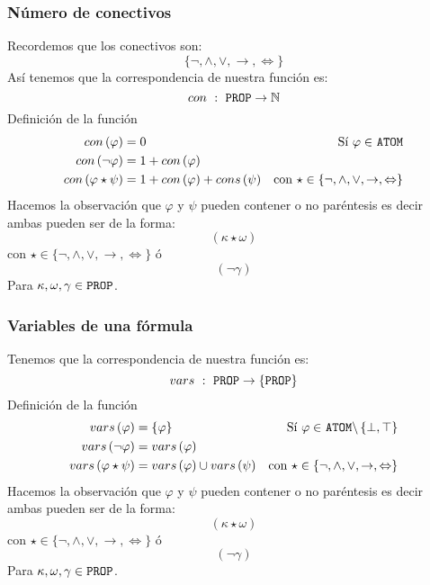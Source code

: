 \documentclass[a4paper]{article}
\begin{document}
\subsubsection{Número de conectivos}
\noindent
Recordemos que los conectivos son:
\[
    \{\neg, \land, \lor, \rightarrow, \Leftrightarrow\}  
\]
Así tenemos que la correspondencia de nuestra función es:
\[
      con \ : \ \text{\texttt{PROP}} \to \mathbb{N}
\]
Definición de la función
\begin{align*}
    con\left(\varphi\right) &= 0 &\text{Sí \(\varphi \in\) \texttt{ATOM}} \\
    con\left(\neg \varphi\right) &= 1 + con\left(\varphi\right) & \\
    con\left(\varphi \star \psi \right) &= 1 + con\left(\varphi\right) + cons\left(\psi\right) & \text{con \(\star \in \{ \neg, \land, \lor, \rightarrow, \Leftrightarrow \}\)} \\
\end{align*}
Hacemos la observación que \(\varphi\) y \(\psi\) pueden contener o no paréntesis es decir ambas pueden ser de la forma:
\[
    \left(\kappa \star \omega \right)  
\]
con \(\star \in \{ \neg, \land, \lor, \rightarrow, \Leftrightarrow \}\) ó
\[
    \left(\neg \gamma\right)
\]
Para \(\kappa, \omega, \gamma \in \text{\texttt{PROP}}\).
\subsubsection{Variables de una fórmula}
Tenemos que la correspondencia de nuestra función es:
\[
      vars \ : \ \text{\texttt{PROP}} \to \{\text{\texttt{PROP}}\}
\]
Definición de la función
\begin{align*}
    vars\left(\varphi\right) &= \{ \varphi \} &\text{Sí \(\varphi \in\) \texttt{ATOM\(\setminus \left\{\bot, \top\right\}\)}} \\
    vars\left(\neg \varphi\right) &= vars\left(\varphi\right) & \\
    vars\left(\varphi \star \psi \right) &= vars\left(\varphi\right) \cup vars\left(\psi\right) & \text{con \(\star \in \{ \neg, \land, \lor, \rightarrow, \Leftrightarrow \}\)} \\
\end{align*}
Hacemos la observación que \(\varphi\) y \(\psi\) pueden contener o no paréntesis es decir ambas pueden ser de la forma:
\[
    \left(\kappa \star \omega \right)  
\]
con \(\star \in \{ \neg, \land, \lor, \rightarrow, \Leftrightarrow \}\) ó
\[
    \left(\neg \gamma\right)
\]
Para \(\kappa, \omega, \gamma \in \text{\texttt{PROP}}\).
\end{document}
